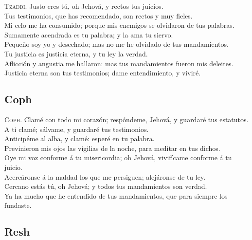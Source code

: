  \textsc{Tzaddi}. Justo eres tú, oh Jehová, y rectos tus
juicios.\\
 Tus testimonios, que has recomendado, son rectos y muy
fieles.\\
 Mi celo me ha consumido; porque mis enemigos se
olvidaron de tus palabras.\\
 Sumamente acendrada es tu palabra; y la ama tu
siervo.\\
 Pequeño soy yo y desechado; mas no me he olvidado de
tus mandamientos.\\
 Tu justicia es justicia eterna, y tu ley la verdad.\\
 Aflicción y angustia me hallaron: mas tus mandamientos
fueron mis deleites.\\
 Justicia eterna son tus testimonios; dame
entendimiento, y viviré.

\hypertarget{coph}{%
\subsection{Coph}\label{coph}}

 \textsc{Coph}. Clamé con todo mi corazón; respóndeme,
Jehová, y guardaré tus estatutos.\\
 A ti clamé; sálvame, y guardaré tus testimonios.\\
 Anticipéme al alba, y clamé: esperé en tu palabra.\\
 Previnieron mis ojos las vigilias de la noche, para
meditar en tus dichos.\\
 Oye mi voz conforme á tu misericordia; oh Jehová,
vivifícame conforme á tu juicio.\\
 Acercáronse á la maldad los que me persiguen;
alejáronse de tu ley.\\
 Cercano estás tú, oh Jehová; y todos tus mandamientos
son verdad.\\
 Ya ha mucho que he entendido de tus mandamientos, que
para siempre los fundaste.

\hypertarget{resh}{%
\subsection{Resh}\label{resh}}

